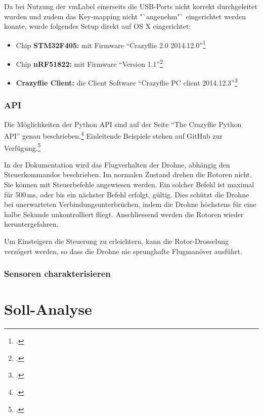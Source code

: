 Da bei Nutzung der \gls{vmLabel} einerseits die USB-Ports nicht korrekt durchgeleitet wurden und zudem das Key-mapping nicht "`angenehm"` eingerichtet werden konnte, wurde folgendes Setup direkt auf OS X eingerichtet:
\begin{itemize}
	\item Chip \textbf{STM32F405:} mit Firmware "`Crazyflie 2.0 2014.12.0"'\footcite{bitcraze_crazyflie-firmware_2015-03-30}
	\item Chip \textbf{nRF51822:} mit Firmware "`Version 1.1"'\footcite{bitcraze_crazyflie2-nrf-firmware_2015-03-30}
	\item \textbf{Crazyflie Client:} die Client Software "`Crazyflie PC client 2014.12.3"'\footcite{bitcraze_crazyflie-clients-python_2015-03-30}
\end{itemize}


\subsubsection{API}
\label{subsubsec:droneApi}
Die Möglichkeiten der Python API sind auf der Seite "`The Crazyflie Python API"' genau beschrieben.\footcite{doc_crazyflie_api_python_index_Bitcraze_Wiki_2015-03-30}
Einleitende Beispiele stehen auf GitHub zur Verfügung.\footcite{crazyflie-clients-python_examples_crazyflie-clients-python_2015-03-30}

In der Dokumentation wird das Flugverhalten der Drohne, abhängig den Steuerkommandos beschrieben.
Im normalen Zustand drehen die Rotoren nicht.
Sie können mit Steuerbefehle angewiesen werden.
Ein solcher Befehl ist maximal für 500\,ms, oder bis ein nächster Befehl erfolgt, gültig.
Dies schützt die Drohne bei unerwarteten Verbindungsunterbrüchen, indem die Drohne höchstens für eine halbe Sekunde unkontrolliert fliegt.
Anschliessend werden die Rotoren wieder heruntergefahren.

Um Einsteigern die Steuerung zu erleichtern, kann die Rotor-Drosselung verzögert werden, so dass die Drohne nie sprunghafte Flugmanöver ausführt.


\subsubsection{Sensoren charakterisieren}



\section{Soll-Analyse}

